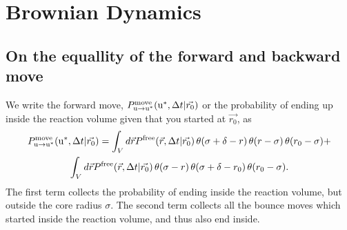 \section{Brownian Dynamics}

\subsection{ On the equallity of the forward and backward move}
We write the forward move, $P^{\rm move}_{{\rm u} \to {\rm u}^*}({\rm u}^*,\Delta t|\vec{r_0})$ or the probability of ending up inside the reaction volume given that you started at $\vec{r_0}$, as
\begin{multline}
 P^{\rm move}_{{\rm u} \to {\rm u}^*}({\rm u}^*,\Delta t|\vec{r_0}) = \int_{V} d\vec{r} P^{\rm free}(\vec{r},\Delta t|\vec{r_0}) \, \theta(\sigma + \delta - r) \, \theta(r - \sigma) \, \theta(r_0 - \sigma) + \\ \int_{V} d\vec{r} P^{\rm free}(\vec{r},\Delta t|\vec{r_0}) \, \theta(\sigma - r) \, \theta(\sigma + \delta - r_0)  \, \theta(r_0 - \sigma).
\elabel{fwd_move}
\end{multline}
The first term collects the probability of ending inside the reaction volume, but outside the core radius $\sigma$. The second term collects all the bounce moves which started inside the reaction volume, and thus also end inside.

